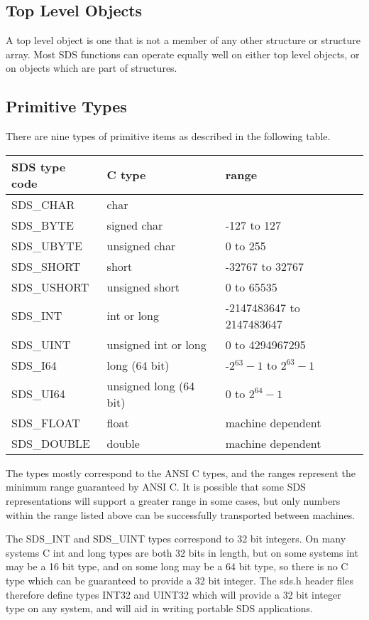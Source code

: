 \subsection{Top Level Objects}

A top level object is one that is not a member of any other structure or
structure array. Most SDS functions can operate equally well on either top level
objects, or on objects which are part of structures.

\subsection{Primitive Types}

There are nine types of primitive items as described in the following table.

\begin{tabular}{|l|l|l|}
\hline
SDS type code & C type & range \\
\hline
SDS\_CHAR & char & \\
SDS\_BYTE & signed char & -127 to 127 \\
SDS\_UBYTE & unsigned char & 0 to 255 \\
SDS\_SHORT & short & -32767 to 32767 \\
SDS\_USHORT & unsigned short & 0 to 65535 \\
SDS\_INT & int or long & -2147483647 to 2147483647 \\
SDS\_UINT & unsigned int or long & 0 to 4294967295 \\
SDS\_I64 & long (64 bit) & -2$^{63}-1$ to $2^{63}-1$ \\
SDS\_UI64 & unsigned long (64 bit) & 0 to $2^{64}-1$ \\
SDS\_FLOAT & float & machine dependent \\
SDS\_DOUBLE & double & machine dependent \\
\hline
\end{tabular}

The types mostly correspond to the ANSI C types, and the ranges represent the minimum
range guaranteed by ANSI C. It is possible that some SDS representations will
support a greater range in some cases, but only numbers within the range listed
above can be successfully transported between machines.

The SDS\_INT and SDS\_UINT types correspond to 32 bit integers. On many systems
C int and long types are both 32 bits in length, but on some systems int may
be a 16 bit type, and on some long may be a 64 bit type, so there is no
C type which can be guaranteed to provide a 32 bit integer. The sds.h
header files therefore define types INT32 and UINT32 which will provide a 32 bit integer type on any system, and will aid in writing portable SDS applications.


